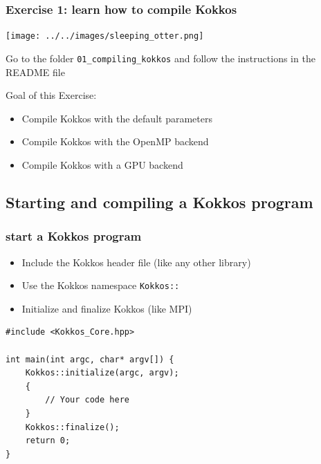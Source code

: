 \documentclass[aspectratio=169]{beamer}
\begin{document}
\begin{frame}[fragile]
    \frametitle{Exercise 1: learn how to compile Kokkos}

    \begin{center}
    \texttt{[image: ../../images/sleeping\_otter.png]}
    \end{center}

    Go to the folder \texttt{01\_compiling\_kokkos} and follow the instructions in the README file

    Goal of this Exercise:
    \begin{itemize}
        \item Compile Kokkos with the default parameters
        \item Compile Kokkos with the OpenMP backend
        \item Compile Kokkos with a GPU backend
    \end{itemize}

\end{frame}


\subsection[Starting a Kokkos program]{Starting and compiling a Kokkos program}


\begin{frame}[fragile]
    \frametitle{start a Kokkos program} 
    \begin{itemize}
        \item Include the Kokkos header file (like any other library)
        \item Use the Kokkos namespace \texttt{Kokkos::}
        \item Initialize and finalize Kokkos (like MPI)
    \end{itemize}

\begin{verbatim}
#include <Kokkos_Core.hpp>

int main(int argc, char* argv[]) {
    Kokkos::initialize(argc, argv);
    {
        // Your code here
    }
    Kokkos::finalize();
    return 0;
}
\end{verbatim}

\end{frame}
\end{document}
